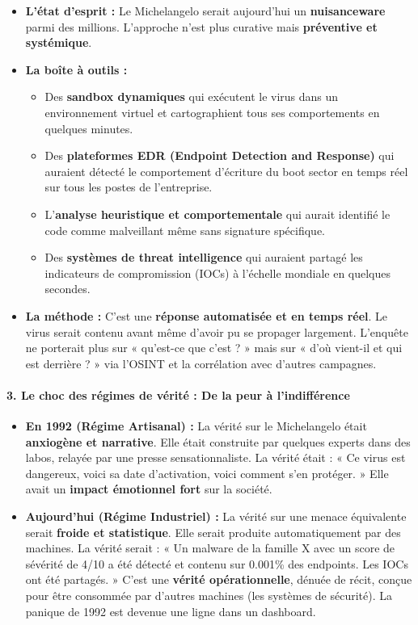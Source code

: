 \documentclass[12pt]{article}
\begin{document}
\begin{itemize}
\item \textbf{L'état d'esprit :} Le Michelangelo serait aujourd'hui un \textbf{nuisanceware} parmi des millions. L'approche n'est plus curative mais \textbf{préventive et systémique}.
\item \textbf{La boîte à outils :}
\begin{itemize}
\item Des \textbf{sandbox dynamiques} qui exécutent le virus dans un environnement virtuel et cartographient tous ses comportements en quelques minutes.
\item Des \textbf{plateformes EDR (Endpoint Detection and Response)} qui auraient détecté le comportement d'écriture du boot sector en temps réel sur tous les postes de l'entreprise.
\item L'\textbf{analyse heuristique et comportementale} qui aurait identifié le code comme malveillant même sans signature spécifique.
\item Des \textbf{systèmes de threat intelligence} qui auraient partagé les indicateurs de compromission (IOCs) à l'échelle mondiale en quelques secondes.
\end{itemize}
\item \textbf{La méthode :} C'est une \textbf{réponse automatisée et en temps réel}. Le virus serait contenu avant même d'avoir pu se propager largement. L'enquête ne porterait plus sur « qu'est-ce que c'est ? » mais sur « d'où vient-il et qui est derrière ? » via l'OSINT et la corrélation avec d'autres campagnes.
\end{itemize}

\paragraph{3. Le choc des régimes de vérité : De la peur à l'indifférence}

\begin{itemize}
\item \textbf{En 1992 (Régime Artisanal) :} La vérité sur le Michelangelo était \textbf{anxiogène et narrative}. Elle était construite par quelques experts dans des labos, relayée par une presse sensationnaliste. La vérité était : « Ce virus est dangereux, voici sa date d'activation, voici comment s'en protéger. » Elle avait un \textbf{impact émotionnel fort} sur la société.
\item \textbf{Aujourd'hui (Régime Industriel) :} La vérité sur une menace équivalente serait \textbf{froide et statistique}. Elle serait produite automatiquement par des machines. La vérité serait : « Un malware de la famille X avec un score de sévérité de 4/10 a été détecté et contenu sur 0.001\% des endpoints. Les IOCs ont été partagés. » C'est une \textbf{vérité opérationnelle}, dénuée de récit, conçue pour être consommée par d'autres machines (les systèmes de sécurité). La panique de 1992 est devenue une ligne dans un dashboard.
\end{itemize}
\end{document}
